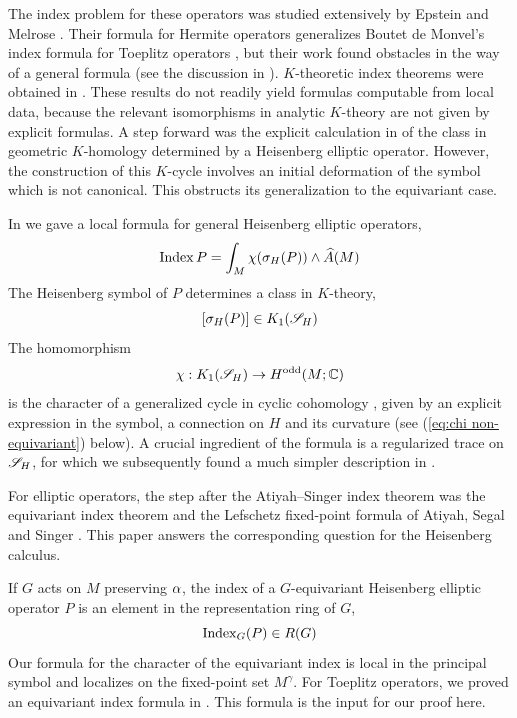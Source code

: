 \documentclass[11pt]{amsart}
\theoremstyle{plain}
\theoremstyle{definition}
\theoremstyle{remark}
\begin{document}
The index problem for these operators was studied extensively by Epstein and Melrose \cite{EM98,Ep04,EMxx}.
Their formula for Hermite operators generalizes Boutet de Monvel's index formula for Toeplitz operators \cite{Bo79}, but their work found obstacles in the way of a general formula (see the discussion in \cite{Ep04}).
$K$-theoretic index theorems were obtained in \cite{vE10a, vE10b}.
These results do not readily yield formulas computable from local data, because the relevant isomorphisms in analytic $K$-theory are not given by explicit formulas.
A step forward was the explicit calculation in \cite{BvE14} of the class in geometric $K$-homology determined by a Heisenberg elliptic operator. However, the construction of this $K$-cycle involves an initial deformation of the symbol which is not canonical. This obstructs its generalization to the equivariant case.


In \cite{GvE20} we gave a local formula for general Heisenberg elliptic operators,
\begin{equation}\label{eq:non-equivariant index formula}
     \operatorname{Index} P=\int_M \chi(\sigma_H(P))\wedge \widehat{A}(M)
\end{equation}
The Heisenberg symbol of $P$ determines a class in $K$-theory,
\[ [\sigma_H(P)]\in K_1({\mathscr{S}_H})\]
The homomorphism
\[\chi:K_1({\mathscr{S}_H})\to H^{\mathrm{odd}}(M;{\mathbb{C}})\]
is the character of a generalized cycle in cyclic cohomology \cite{gor1,gor2}, given by an explicit expression  in the  symbol, a connection on $H$ and its curvature (see (\ref{eq:chi non-equivariant}) below).
A crucial ingredient of the formula is a regularized trace on ${\mathscr{S}_H}$,
for which we subsequently found a much simpler description in \cite{GvE25}.

For elliptic operators, the step after the Atiyah--Singer index theorem was the equivariant index theorem and the Lefschetz fixed-point formula of Atiyah, Segal and Singer \cite{AS2,AS3}.
This paper answers the corresponding question for the Heisenberg calculus.



If $G$ acts on $M$ preserving $\alpha$, the index of a $G$-equivariant Heisenberg elliptic operator $P$ is an element in the representation ring of $G$,
\[ \operatorname{Index}_G (P)\in R(G)\]
Our formula for the character of the equivariant index is local in the principal symbol and localizes on the fixed-point set $M^\gamma$.
For Toeplitz operators, we proved an equivariant index formula  in \cite{GvE26}. This formula is the input for our proof  here.
\end{document}
